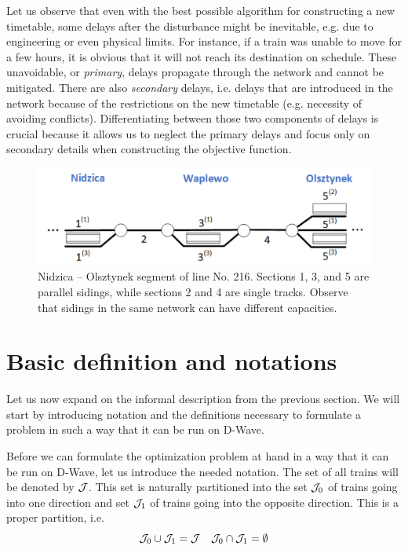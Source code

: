 Let us observe that even with the best possible algorithm for constructing a new timetable, some
delays after the disturbance might be inevitable, e.g. due to engineering or even physical limits.
For instance, if a train was unable to move for a few hours, it is obvious that it will not reach
its destination on schedule. These unavoidable, or \emph{primary}, delays propagate through the
network and cannot be mitigated. There are also \emph{secondary} delays, i.e. delays that are
introduced in the network because of the restrictions on the new timetable (e.g. necessity of
avoiding conflicts). Differentiating between those two components of delays is crucial because it
allows us to neglect the primary delays and focus only on secondary details when constructing the
objective function.

\begin{figure}
    \includegraphics[width=\textwidth]{figures/line_small.pdf}
    \caption{ Nidzica -- Olsztynek segment of line No. 216. Sections 1, 3, and 5 are parallel
      sidings, while sections 2 and 4 are single tracks. Observe that sidings in the same network
      can have different capacities.
    }
    \label{fig:railway-network}
\end{figure}

\section{Basic definition and notations}
Let us now expand on the informal description from the previous section. We will start by introducing
notation and the definitions necessary to formulate a problem in such a way that it can be run on D-Wave.

Before we can formulate the optimization problem at hand in a way that it can be run on D-Wave, let
us introduce the needed notation. The set of all trains will be denoted by $\mathcal{J}$. This set is
naturally partitioned into the set $\mathcal{J}_0$ of trains going into one direction and set $\mathcal{J}_1$ of
trains going into the opposite direction. This is a proper partition, i.e.
\begin{equation}
	\mathcal{J}_0 \cup \mathcal{J}_1 = \mathcal{J} \quad \mathcal{J}_0 \cap \mathcal{J}_1 = \emptyset
\end{equation}

